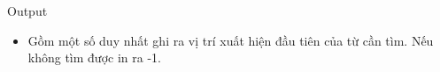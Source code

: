 Output
\begin{itemize}
	\item Gồm một số duy nhất ghi ra vị trí xuất hiện đầu tiên của từ cần tìm. Nếu không tìm được in ra -1.
\end{itemize}